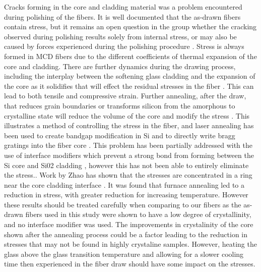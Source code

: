 Cracks forming in the core and cladding material was a problem encountered during polishing of the fibers. It is well documented that the as-drawn fibers contain stress, but it remains an open question in the group whether the cracking observed during polishing results solely from internal stress, or may also be caused by forces experienced during the polishing procedure \cite{Healy2018AFibres, Fokine2017LaserFibers, LapointeElectricalFibres, KristinKristin_thesis_final}. 
Stress is always formed in MCD fibers due to the different coefficients of thermal expansion of the core and cladding. There are further dynamics during the drawing process, including the interplay between the softening glass cladding and the expansion of the core as it solidifies that will effect the residual stresses in the fiber \cite{Healy2018AFibres}. This can lead to both tensile and compressive strain. Further annealing, after the draw, that reduces grain boundaries or transforms silicon from the amorphous to crystalline state will reduce the volume of the core and modify the stress \cite{Zhao2017EffectFibre}. This illustrates a method of controlling the stress in the fiber, and laser annealing has been used to create bandgap modification in Si \cite{Healy2014ExtremeFibres} and to directly write bragg gratings into the fiber core \cite{Fokine2017LaserFibers}. This problem has been partially addressed with the use of interface modifiers which prevent a strong bond from forming between the Si core and Si02 cladding \cite{Gibson2013AlkalineFibers}, however this has not been able to entirely eliminate the stress.. 
 Work by Zhao has shown that the stresses are concentrated in a ring near the core cladding interface \cite{Zhao2018EffectsFiber}. It was found that furnace annealing led to a reduction in stress, with greater reduction for increasing temperature. However these results should be treated carefully when comparing to our fibers as the as-drawn fibers used in this study were shown to have a low degree of crystallinity, and no interface modifier was used. The improvements in crystalinity of the core shown after the annealing process could be a factor leading to the reduction in stresses that may not be found in highly crystaline samples. However, heating the glass above the glass transition temperature and allowing for a slower cooling time then experienced in the fiber draw should have some impact on the stresses.

